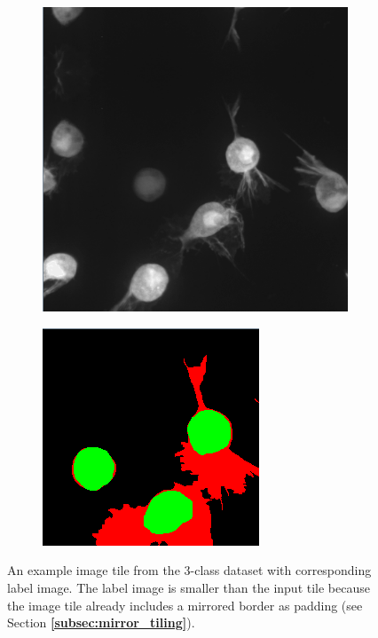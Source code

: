 \begin {figure}[!htb]
	
	\begin {subfigure}[{position=b}]{0.6\linewidth}
		\begin {center}
		\includegraphics[scale=0.65]{img/dataset_ex1.png}
		\end{center}
	\end {subfigure}
	\begin {subfigure}[{position=b}]{0.3\linewidth}
		\begin {center}
		\includegraphics[scale=0.60]{img/dataset_ex2.png}
		\end{center}
	\end {subfigure}

		\caption[An example image tile from the 3-class dataset.]{An example image tile from the 3-class dataset with corresponding label image. The label image is smaller than the input tile because the image tile already includes a mirrored border as padding (see Section \textbf{\ref{subsec:mirror_tiling}}).}
		\label{fig:dataset_example}
	

\end {figure}

